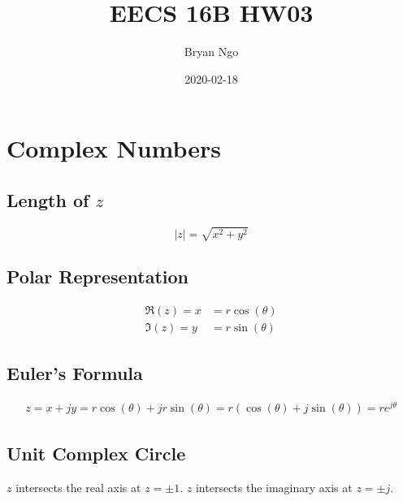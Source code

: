\documentclass[]{article}
\title{EECS 16B HW03}
\author{Bryan Ngo}
\date{2020-02-18}
\begin{document}
\maketitle

\section{Complex Numbers}

\subsection{Length of \(z\)}

\begin{equation}
	|z| = \sqrt{x^2 + y^2}
\end{equation}

\subsection{Polar Representation}

\begin{align}
	\Re(z) = x &= r \cos(\theta) \\
	\Im(z) = y &= r \sin(\theta)
\end{align}

\subsection{Euler's Formula}

\begin{align}
	z = x + jy = r \cos(\theta) + jr \sin(\theta) = r(\cos(\theta) + j \sin(\theta)) = re^{j\theta}
\end{align}

\subsection{Unit Complex Circle}

\begin{center}
\end{center}
\(z\) intersects the real axis at \(z = \pm 1\).
\(z\) intersects the imaginary axis at \(z = \pm j\).
\end{document}
